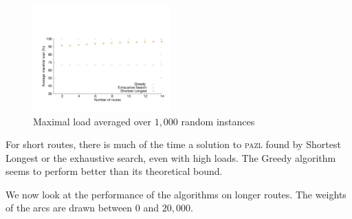 \documentclass[10pt, conference, letterpaper]{IEEEtran}
\newcommand\pazl{\textsc{pazl}\xspace}
\begin{document}
        
      \begin{figure}[h]
      \begin{center}
	 \includegraphics[width=0.47\textwidth]{periode_petite.pdf}
      \end{center}
      \caption{Maximal load averaged over $1,000$ random instances}\label{fig:short}
      \end{figure}
       
      For short routes, there is much of the time a solution to \pazl found by Shortest Longest or the exhaustive search, even with high loads. The Greedy algorithm seems to perform better than its theoretical bound.
      
%      

We now look at the performance of the algorithms on longer routes. The weights of the arcs are drawn between $0$ and $20,000$.
\end{document}
